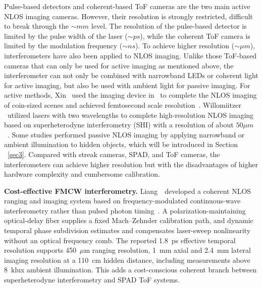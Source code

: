 Pulse-based detectors and coherent-based ToF cameras are the two main active NLOS imaging cameras. However, their resolution is strongly restricted, difficult to break through the $\sim mm$ level. The resolution of the pulse-based detector is limited by the pulse width of the laser ($\sim ps$), while the coherent ToF camera is limited by the modulation frequency ($\sim ns$). To achieve higher resolution ($\sim \mu m$), interferometers have also been applied to NLOS imaging. Unlike those ToF-based cameras that can only be used for active imaging as mentioned above, the interferometer can not only be combined with narrowband LEDs or coherent light for active imaging, but also be used with ambient light for passive imaging. For active methods, Xin \etal~used the imaging device in~\cite{gkioulekas_micron-scale_2015} to complete the NLOS imaging of coin-sized scenes and achieved femtosecond scale resolution~\cite{xinTheoryFermatPaths2019}. Willomiitzer \etal~utilized lasers with two wavelengths to complete high-resolution NLOS imaging based on superheterodyne interferometry (SHI) with a resolution of about $50 \mu m$~\cite{Willomitzer:18}. Some studies performed passive NLOS imaging by applying narrowband or ambient illumination to hidden objects, which will be introduced in Section ~\ref{sec3}. Compared with streak cameras, SPAD, and ToF cameras, the interferometers can achieve higher resolution but with the disadvantages of higher hardware complexity and cumbersome calibration.



\vspace{0.8mm}
\noindent \textbf{Cost-effective FMCW interferometry.}
Liang~\etal~developed a coherent NLOS ranging and imaging system based on frequency-modulated continuous-wave interferometry rather than pulsed photon timing~\cite{liangFMCWNLOS2026}. A polarization-maintaining optical-delay fiber supplies a fixed Mach--Zehnder calibration path, and dynamic temporal phase subdivision estimates and compensates laser-sweep nonlinearity without an optical frequency comb. The reported 1.8~ps effective temporal resolution supports 450~$\mu$m ranging resolution, 1~mm axial and 2.4~mm lateral imaging resolution at a 110~cm hidden distance, including measurements above 8~klux ambient illumination. This adds a cost-conscious coherent branch between superheterodyne interferometry and SPAD ToF systems.

